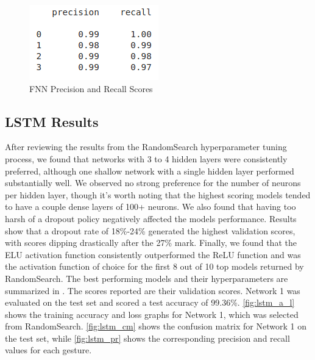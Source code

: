 \documentclass[journal]{IEEEtran}
\begin{document}
\begin{figure}[!t]
	\centering
	\includegraphics[width=0.46\linewidth]{FFNN_prec_rec}
	\caption{FNN Precision and Recall Scores}
	\label{fig:fnn_pr}
\end{figure}

\subsection{LSTM Results}
After reviewing the results from the RandomSearch hyperparameter tuning process, we found that networks with 3 to 4 hidden layers were consistently preferred, although one shallow network with a single hidden layer performed substantially well. We observed no strong preference for the number of neurons per hidden layer, though it’s worth noting that the highest scoring models tended to have a couple dense layers of 100+ neurons. We also found that having too harsh of a dropout policy negatively affected the models performance. Results show that a dropout rate of 18\%-24\% generated the highest validation scores, with scores dipping drastically after the 27\% mark. Finally, we found that the ELU activation function consistently outperformed the ReLU function and was the activation function of choice for the first 8 out of 10 top models returned by RandomSearch. The best performing models and their hyperparameters are summarized in . The scores reported are their validation scores. Network 1 was evaluated on the test set and scored a test accuracy of 99.36\%. \cref{fig:lstm_a_l} shows the training accuracy and loss graphs for Network 1, which was selected from RandomSearch. \cref{fig:lstm_cm} shows the confusion matrix for Network 1 on the test set, while \cref{fig:lstm_pr} shows the corresponding precision and recall values for each gesture. 
\end{document}
